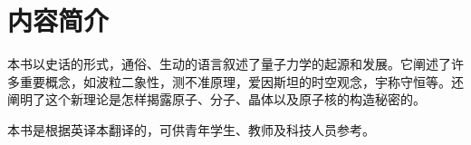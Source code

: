 \chapter{内容简介}

本书以史话的形式，通俗、生动的语言叙述了量子力学的起源和发展。它阐述了许多重要概念，如波粒二象性，测不准原理，爱因斯坦的时空观念，宇称守恒等。还阐明了这个新理论是怎样揭露原子、分子、晶体以及原子核的构造秘密的。 

本书是根据英译本翻译的，可供青年学生、教师及科技人员参考。
